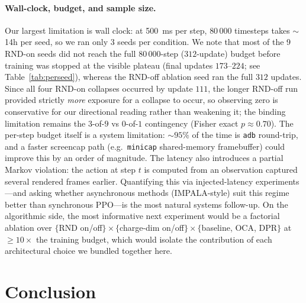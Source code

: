\documentclass{article}
\begin{document}
\paragraph{Wall-clock, budget, and sample size.}
Our largest limitation is wall clock: at \SI{500}{\milli\second}
per step, $80\,000$ timesteps takes $\sim$14h per seed, so we ran
only 3 seeds per condition. We note that most of the 9 RND-on
seeds did not reach the full $80\,000$-step ($312$-update)
budget before training was stopped at the visible plateau (final
updates $173$--$224$; see Table~\ref{tab:perseed}), whereas the
RND-off ablation seed ran the full $312$ updates. Since all four
RND-on collapses occurred by update $111$, the longer RND-off run
provided strictly \emph{more} exposure for a collapse to occur,
so observing zero is conservative for our directional reading
rather than weakening it; the binding limitation remains the
$3$-of-$9$ vs $0$-of-$1$ contingency (Fisher exact
$p \approx 0.70$). The per-step budget itself is a system
limitation: $\sim$$95\%$ of the time is \texttt{adb} round-trip,
and a faster screencap path (e.g.\ \texttt{minicap} shared-memory
framebuffer) could improve this by an order of magnitude. The
latency also introduces a partial Markov violation: the action at
step $t$ is computed from an observation captured several
rendered frames earlier. Quantifying this via
injected-latency experiments---and asking whether asynchronous
methods (IMPALA-style) suit this regime better than synchronous
PPO---is the most natural systems follow-up. On the algorithmic
side, the most informative next experiment would be a factorial
ablation over $\{$RND on/off$\}\times\{$charge-dim on/off$\}\times
\{$baseline, OCA, DPR$\}$ at $\geq 10\times$ the training budget,
which would isolate the contribution of each architectural choice
we bundled together here.

\section{Conclusion}
\label{sec:conclusion}
\end{document}
